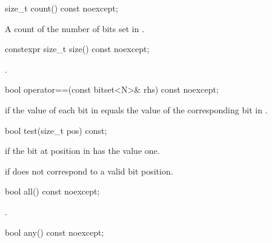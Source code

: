 %
\begin{itemdecl}
size_t count() const noexcept;
\end{itemdecl}

\begin{itemdescr}
\pnum
\returns
A count of the number of bits set in
.
\end{itemdescr}

%
\begin{itemdecl}
constexpr size_t size() const noexcept;
\end{itemdecl}

\begin{itemdescr}
\pnum
\returns
{}.
\end{itemdescr}

%
\begin{itemdecl}
bool operator==(const bitset<N>& rhs) const noexcept;
\end{itemdecl}

\begin{itemdescr}
\pnum
\returns
{} if the value of each bit in
equals the value of the corresponding bit in .
\end{itemdescr}

%
\begin{itemdecl}
bool test(size_t pos) const;
\end{itemdecl}

\begin{itemdescr}
\pnum
\returns
{}
if the bit at position 
in
has the value one.

\pnum
\throws
{}%
 if  does not correspond to a valid bit position.
\end{itemdescr}

%
\begin{itemdecl}
bool all() const noexcept;
\end{itemdecl}

\begin{itemdescr}
\pnum
\returns
{}.
\end{itemdescr}

%
%
\begin{itemdecl}
bool any() const noexcept;
\end{itemdecl}

